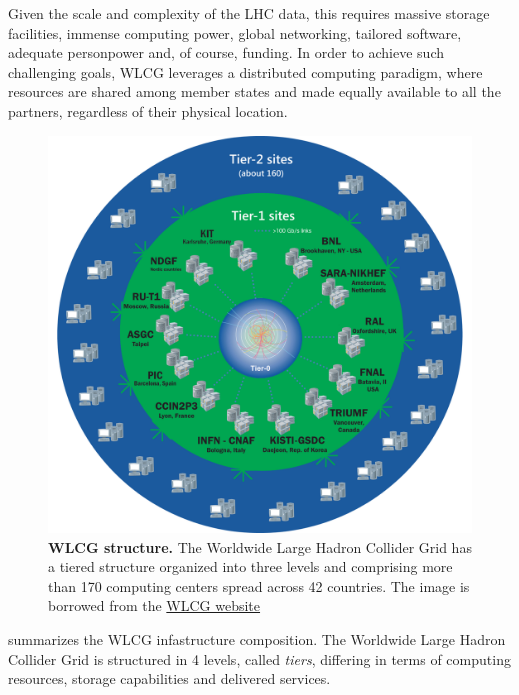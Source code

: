 Given the scale and complexity of the LHC data, this requires massive storage facilities, immense computing power, global networking, tailored software, adequate personpower and, of course, funding.
In order to achieve such challenging goals, WLCG leverages a distributed computing paradigm, where resources are shared among member states and made equally available to all the partners, regardless of their physical location.
\begin{figure}
    \centering
    \includegraphics[width=\textwidth]{figures/220_introduction/WLCG-Tiers-2021_v3.png}
    \caption{\textbf{WLCG structure.} The Worldwide Large Hadron Collider Grid has a tiered structure organized into three levels and comprising more than 170 computing centers spread across 42 countries.
    The image is borrowed from the \href{https://wlcg-public.web.cern.ch/sites/default/files/inline-images/WLCG-Tiers-2021_v3.png}{WLCG website}
    } \label{fig:wlcg}
\end{figure}
 summarizes the WLCG infastructure composition. 
The Worldwide Large Hadron Collider Grid is structured in 4 levels, called \textit{tiers}, differing in terms of computing resources, storage capabilities and delivered services. 
